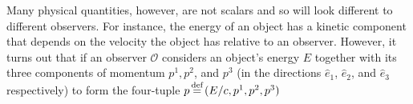 Many physical quantities, however, are not scalars and so will look different to different observers. For instance, the energy of an object has a kinetic component that depends on the velocity the object has relative to an observer. However, it turns out that if an observer $\mathcal{O}$ considers an object's energy $E$ 
 together with its three components of momentum $p^1, p^2$, and $p^3$ (in the directions $\hat{e}_1$, $\hat{e}_2$, and $\hat{e}_3$ respectively) to form the four-tuple $p\myeq(E/c, p^1, p^2, p^3)$ %
